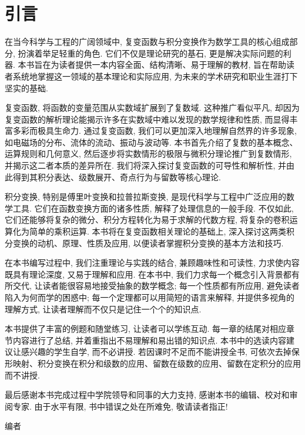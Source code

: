 \chapter{引言}

在当今科学与工程的广阔领域中, 复变函数与积分变换作为数学工具的核心组成部分, 扮演着举足轻重的角色.
它们不仅是理论研究的基石, 更是解决实际问题的利器.
本书旨在为读者提供一本内容全面、结构清晰、易于理解的教材, 旨在帮助读者系统地掌握这一领域的基本理论和实际应用, 为未来的学术研究和职业生涯打下坚实的基础. 

复变函数, 将函数的变量范围从实数域扩展到了复数域.
这种推广看似平凡, 却因为复变函数的解析理论能揭示许多在实数域中难以发现的数学规律和性质, 而显得丰富多彩而极具生命力.
通过复变函数, 我们可以更加深入地理解自然界的许多现象, 如电磁场的分布、流体的流动、振动与波动等.
本书首先介绍了复数的基本概念、运算规则和几何意义, 然后逐步将实数情形的极限与微积分理论推广到复数情形, 并揭示这二者本质的差异所在.
我们将深入探讨复变函数的可导性和解析性, 并由此得到其积分表达、级数展开、奇点行为与留数等核心理论. 

积分变换, 特别是傅里叶变换和拉普拉斯变换, 是现代科学与工程中广泛应用的数学工具.
它们在函数变换方面的诸多性质, 解释了处理信息的一般手段.
不仅如此, 它们还能够将复杂的微分、积分方程转化为易于求解的代数方程, 将复杂的卷积运算化为简单的乘积运算.
本书将在复变函数相关理论的基础上, 深入探讨这两类积分变换的动机、原理、性质及应用, 以便读者掌握积分变换的基本方法和技巧.

在本书编写过程中, 我们注重理论与实践的结合, 兼顾趣味性和可读性, 力求使内容既具有理论深度, 又易于理解和应用.
在本书中, 我们力求每一个概念引入背景都有所交代, 让读者能很容易地接受抽象的数学概念;
每一个性质都有所应用, 避免读者陷入为何而学的困惑中;
每一个定理都可以用简短的语言来解释, 并提供多视角的理解方式, 让读者理解而不仅只是记住一个个的知识点.

本书提供了丰富的例题和随堂练习, 让读者可以学练互动.
每一章的结尾对相应章节内容进行了总结, 并着重指出不易理解和易出错的知识点. 
本书中的选读内容建议让感兴趣的学生自学, 而不必讲授.
若因课时不足而不能讲授全书, 可依次去掉保形映射、积分变换在积分和级数的应用、留数在级数的应用、留数在定积分的应用而不讲授.

最后感谢本书完成过程中学院领导和同事的大力支持, 感谢本书的编辑、校对和审阅专家.
由于水平有限, 书中错误之处在所难免, 敬请读者指正!

\vskip 0.5cm
\begin{flushright}
编者

\zhtoday
\end{flushright}
